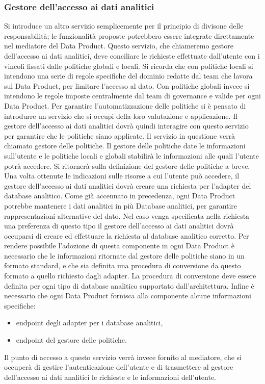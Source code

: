 \documentclass[12pt]{report}
\begin{document}
\subsubsection{Gestore dell'accesso ai dati analitici}
Si introduce un altro servizio semplicemente per il principio di divisone delle responsabilità; le funzionalità proposte potrebbero essere integrate direttamente nel mediatore del Data Product. 
Questo servizio, che chiameremo gestore dell'accesso ai dati analitici, deve conciliare le richieste effettuate dall'utente con i vincoli fissati dalle politiche globali e locali.
Si ricorda che con politiche locali si intendono una serie di regole specifiche del dominio redatte dal team che lavora sul  Data Product, per limitare l'accesso al dato.
Con politiche globali invece si intendono le regole imposte centralmente dal team di governance e valide per ogni Data Product.
Per garantire l'automatizzazione delle politiche si è pensato di introdurre un servizio che si occupi della loro valutazione e applicazione.
Il gestore dell'accesso ai dati analitici dovrà quindi interagire con questo servizio per garantire che le politiche siano applicate.
Il servizio in questione verrà chiamato gestore delle politiche. 
Il gestore delle politiche date le informazioni sull'utente e le politiche locali e globali stabilirà le informazioni alle quali l'utente potrà accedere. 
Si ritornerà sulla definizione del gestore delle politiche a breve.
Una volta ottenute le indicazioni sulle risorse a cui l'utente può accedere, il gestore dell'accesso ai dati analitici dovrà creare una richiesta per l'adapter del database analitico.
Come già accennato in precedenza, ogni Data Product potrebbe mantenere i dati analitici in più Database analitici, per garantire rappresentazioni alternative del dato.
Nel caso venga specificata nella richiesta una preferenza di questo tipo il gestore dell'accesso ai dati analitici dovrà occuparsi di creare ed effettuare la richiesta al database analitico corretto.
Per rendere possibile l'adozione di questa componente in ogni Data Product è necessario  che le informazioni ritornate dal gestore delle politiche siano in un formato standard, e che sia definita una procedura di conversione da questo formato a quello richiesto dagli adapter.
La procedura di conversione deve essere definita per ogni tipo di database analitico supportato dall'architettura.
Infine è necessario che ogni Data Product fornisca alla componente alcune informazioni specifiche: 
\begin{itemize}
    \item endpoint degli adapter per i database analitici,
    \item endpoint del gestore delle politiche. 
\end{itemize}
Il punto di accesso a questo servizio verrà invece fornito al mediatore, che si occuperà di gestire l'autenticazione dell'utente e di trasmettere al gestore dell'accesso ai dati analitici le richieste e le informazioni dell'utente.
\end{document}
